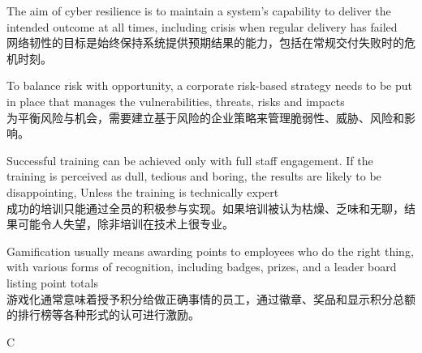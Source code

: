 \documentclass{article}
\begin{document}
\begin{choices}
    \item The aim of cyber resilience is to maintain a system’s capability to deliver the intended outcome at all times, including crisis when regular delivery has failed\\
    网络韧性的目标是始终保持系统提供预期结果的能力，包括在常规交付失败时的危机时刻。
    \item To balance risk with opportunity, a corporate risk-based strategy needs to be put in place that manages the vulnerabilities, threats, risks and impacts\\
    为平衡风险与机会，需要建立基于风险的企业策略来管理脆弱性、威胁、风险和影响。
    \item Successful training can be achieved only with full staff engagement. If the training is perceived as dull, tedious and boring, the results are likely to be disappointing, Unless the training is technically expert\\
    成功的培训只能通过全员的积极参与实现。如果培训被认为枯燥、乏味和无聊，结果可能令人失望，除非培训在技术上很专业。
    \item Gamification usually means awarding points to employees who do the right thing, with various forms of recognition, including badges, prizes, and a leader board listing point totals\\
    游戏化通常意味着授予积分给做正确事情的员工，通过徽章、奖品和显示积分总额的排行榜等各种形式的认可进行激励。
\end{choices}

\begin{correctanswer}
    C
\end{correctanswer}
\end{document}
